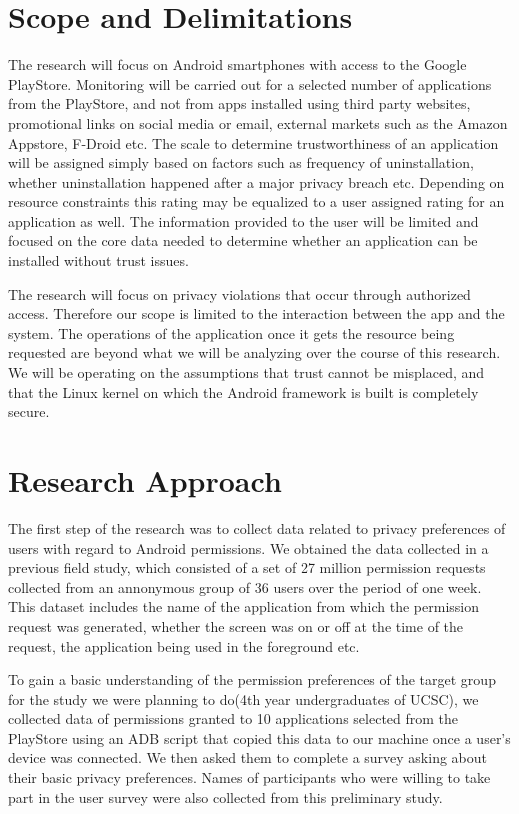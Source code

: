 \section{Scope and Delimitations}
The research will focus on Android smartphones with access to the Google PlayStore. Monitoring will be carried out for a selected number of applications from the PlayStore, and not from apps installed using third party websites, promotional links on social media or email, external markets such as the Amazon Appstore, F-Droid etc. The scale to determine trustworthiness of an application will be assigned simply based on factors such as frequency of uninstallation, whether uninstallation happened after a major privacy breach etc. Depending on resource constraints this rating may be equalized to a user assigned rating for an application as well. The information provided to the user will be limited and focused on the core data needed to determine whether an application can be installed without trust issues.
\smallskip 

The research will focus on privacy violations that occur through authorized access. Therefore our scope is limited to the interaction between the app and the system. The operations of the application once it gets the resource being requested are beyond what we will be analyzing over the course of this research. We will be operating on the assumptions that trust cannot be misplaced, and that the Linux kernel on which the Android framework is built is completely secure.

\section{Research Approach}
The first step of the research was to collect data related to privacy preferences of users with regard to Android permissions. We obtained the data collected in a previous field study\cite{wijesekera2015android}, which consisted of a set of 27 million permission requests collected from an annonymous group of 36 users over the period of one week. This dataset includes the name of the application from which the permission request was generated, whether the screen was on or off at the time of the request, the application being used in the foreground etc. 
\smallskip

To gain a basic understanding of the permission preferences of the target group for the study we were planning to do(4th year undergraduates of UCSC), we collected data of permissions granted to 10 applications selected from the PlayStore using an ADB script that copied this data to our machine once a user's device was connected. We then asked them to complete a survey asking about their basic privacy preferences. Names of participants who were willing to take part in the user survey were also collected from this preliminary study. 
\smallskip

